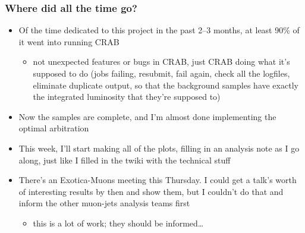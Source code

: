 \documentclass[compress]{beamer}
\begin{document}
\begin{frame}
\frametitle{Where did all the time go?}
\begin{itemize}
\item Of the time dedicated to this project in the past 2--3 months,
  at least 90\% of it went into running CRAB
\begin{itemize}
\item not unexpected features or bugs in CRAB, just CRAB doing what it's
  supposed to do (jobs failing, resubmit, fail again, check all the
  logfiles, eliminate duplicate output, so that the background samples
  have exactly the integrated luminosity that they're supposed to)
\end{itemize}
\item Now the samples are complete, and I'm almost done implementing
  the optimal arbitration
\item This week, I'll start making all of the plots, filling in an
  analysis note as I go along, just like I filled in the twiki with
  the technical stuff
\item There's an Exotica-Muons meeting this Thursday.  I could get a
  talk's worth of interesting results by then and show them, but I
  couldn't do that and inform the other muon-jets analysis teams first
\begin{itemize}
\item this is a lot of work; they should be informed\ldots
\end{itemize}
\end{itemize}
\label{numpages}
\end{frame}





\end{document}
